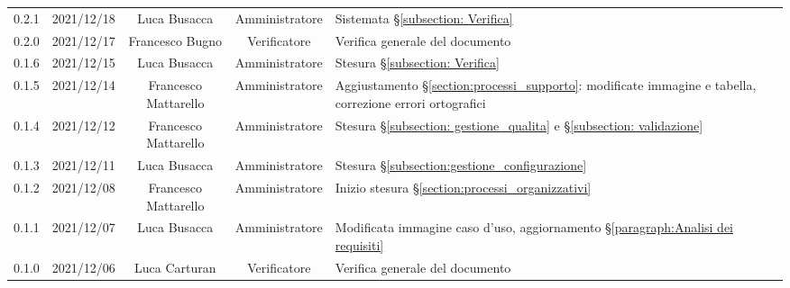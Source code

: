\begin{center}
\begin{longtable}[c]{c | c | c | c | p{5cm}}
		0.2.1                                                      & 2021/12/18 & Luca Busacca                         & Amministratore & Sistemata §\ref{subsection: Verifica}                                                                                                     \\
		0.2.0                                                      & 2021/12/17 & Francesco Bugno                      & Verificatore   & Verifica generale del documento                                                                                                           \\
		0.1.6                                                      & 2021/12/15 & Luca Busacca                         & Amministratore & Stesura §\ref{subsection: Verifica}                                                                                                       \\
		0.1.5                                                      & 2021/12/14 & Francesco Mattarello                 & Amministratore & Aggiustamento §\ref{section:processi_supporto}: modificate immagine e tabella, correzione errori ortografici                              \\
		0.1.4                                                      & 2021/12/12 & Francesco Mattarello                 & Amministratore & Stesura §\ref{subsection: gestione_qualita} e §\ref{subsection: validazione}                                                              \\
		0.1.3                                                      & 2021/12/11 & Luca Busacca                         & Amministratore & Stesura  §\ref{subsection:gestione_configurazione}                                                                                        \\
		0.1.2                                                      & 2021/12/08 & Francesco Mattarello                 & Amministratore & Inizio stesura §\ref{section:processi_organizzativi}                                                                                      \\
		0.1.1                                                      & 2021/12/07 & Luca Busacca                         & Amministratore & Modificata immagine caso d'uso, aggiornamento §\ref{paragraph:Analisi dei requisiti}                                                      \\
		0.1.0                                                      & 2021/12/06 & Luca Carturan                        & Verificatore   & Verifica generale del documento                                                                                                           \\

\end{longtable}
\end{center}

